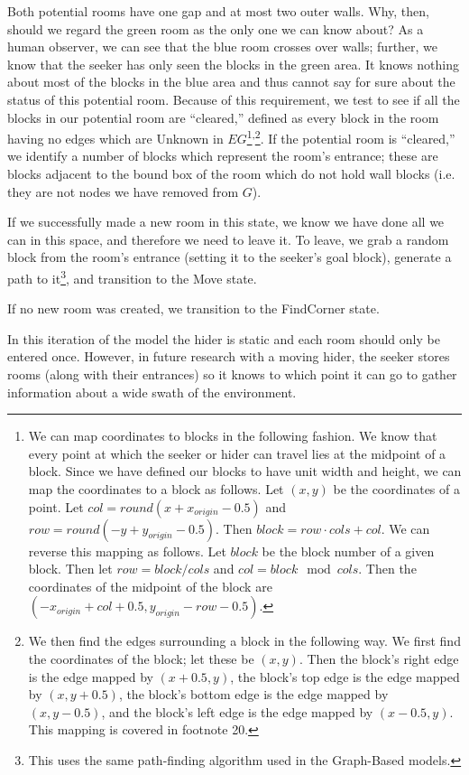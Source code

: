 \documentclass[12pt]{article}
\begin{document}
Both potential rooms have one gap and at most two outer walls. Why, then, should we regard the green room as the only one we can know about? As a human observer, we can see that the blue room crosses over walls; further, we know that the seeker has only seen the blocks in the green area. It knows nothing about most of the blocks in the blue area and thus cannot say for sure about the status of this potential room. Because of this requirement, we test to see if all the blocks in our potential room are ``cleared,'' defined as every block in the room having no edges which are Unknown in $ EG $\footnote{We can map coordinates to blocks in the following fashion. We know that every point at which the seeker or hider can travel lies at the midpoint of a block. Since we have defined our blocks to have unit width and height, we can map the coordinates to a block as follows. Let $ (x, y) $ be the coordinates of a point. Let $ col = round (x + x_{origin} - 0.5) $ and $ row = round (-y + y_{origin} - 0.5) $. Then $ block = row \cdot cols + col $. We can reverse this mapping as follows. Let $ block $ be the block number of a given block. Then let $ row = block / cols $ and $ col = block \mod cols $. Then the coordinates of the midpoint of the block are $(-x_{origin} + col + 0.5, y_{origin} - row - 0.5) $.}\textsuperscript{,}\footnote{We then find the edges surrounding a block in the following way. We first find the coordinates of the block; let these be $ (x, y) $. Then the block's right edge is the edge mapped by $ (x + 0.5, y) $, the block's top edge is the edge mapped by $ (x, y + 0.5) $, the block's bottom edge is the edge mapped by $ (x, y - 0.5) $, and the block's left edge is the edge mapped by $ (x - 0.5, y) $. This mapping is covered in footnote 20.}. If the potential room is ``cleared,'' we identify a number of blocks which represent the room's entrance; these are blocks adjacent to the bound box of the room which do not hold wall blocks (i.e. they are not nodes we have removed from $ G $).  

If we successfully made a new room in this state, we know we have done all we can in this space, and therefore we need to leave it. To leave, we grab a random block from the room's entrance (setting it to the seeker's goal block), generate a path to it\footnote{This uses the same path-finding algorithm used in the Graph-Based models.}, and transition to the Move state. 

If no new room was created, we transition to the FindCorner state.

In this iteration of the model the hider is static and each room should only be entered once. However, in future research with a moving hider, the seeker stores rooms (along with their entrances) so it knows to which point it can go to gather information about a wide swath of the environment. 
\end{document}
